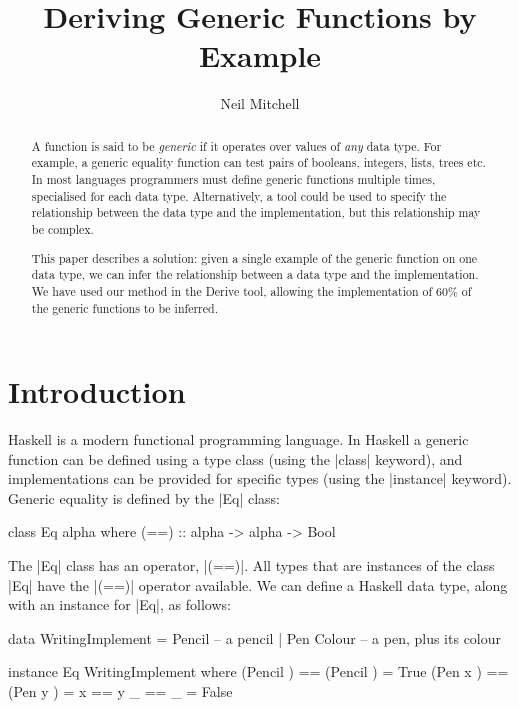 \documentclass{llncs}
\begin{document}
\title{Deriving Generic Functions by Example}
\author{Neil Mitchell}


\maketitle

\begin{abstract}
A function is said to be \textit{generic} if it operates over values of \textit{any} data type. For example, a generic equality function can test pairs of booleans, integers, lists, trees etc. In most languages programmers must define generic functions multiple times, specialised for each data type. Alternatively, a tool could be used to specify the relationship between the data type and the implementation, but this relationship may be complex.

This paper describes a solution: given a single example of the generic function on one data type, we can infer the relationship between a data type and the implementation. We have used our method in the Derive tool, allowing the implementation of 60\% of the generic functions to be inferred.
\end{abstract}

\section{Introduction}

Haskell \cite{haskell} is a modern functional programming language. In Haskell a generic function can be defined using a type class \cite{wadler:type_classes} (using the |class| keyword), and implementations can be provided for specific types (using the |instance| keyword). Generic equality is defined by the |Eq| class:

\begin{code}
class Eq alpha where
    (==) :: alpha -> alpha -> Bool
\end{code}

The |Eq| class has an operator, |(==)|. All types that are instances of the class |Eq| have the |(==)| operator available. We can define a Haskell data type, along with an instance for |Eq|, as follows:

\begin{code}
data WritingImplement  =  Pencil       -- a pencil
                       |  Pen Colour   -- a pen, plus its colour

instance Eq WritingImplement where
    (Pencil     )  == (Pencil     )  = True
    (Pen     x  )  == (Pen     y  )  = x == y
    _              == _              = False
\end{code}
\end{document}
